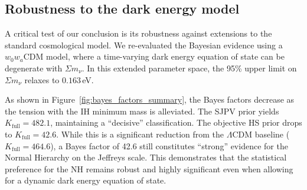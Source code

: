 \documentclass[]{article}
\begin{document}
\subsection{Robustness to the dark energy model}
A critical test of our conclusion is its robustness against extensions to the standard cosmological model. We re-evaluated the Bayesian evidence using a $w_0w_a$CDM model, where a time-varying dark energy equation of state can be degenerate with $\Sigma m_\nu$. In this extended parameter space, the 95\% upper limit on $\Sigma m_\nu$ relaxes to $0.163$\,eV.

As shown in Figure~\ref{fig:bayes_factors_summary}, the Bayes factors decrease as the tension with the IH minimum mass is alleviated. The SJPV prior yields $K_{\text{full}} = 482.1$, maintaining a ``decisive'' classification. The objective HS prior drops to $K_{\text{full}} = 42.6$. While this is a significant reduction from the $\Lambda$CDM baseline ($K_{\text{full}} = 464.6$), a Bayes factor of 42.6 still constitutes ``strong'' evidence for the Normal Hierarchy on the Jeffreys scale. This demonstrates that the statistical preference for the NH remains robust and highly significant even when allowing for a dynamic dark energy equation of state.
\end{document}

